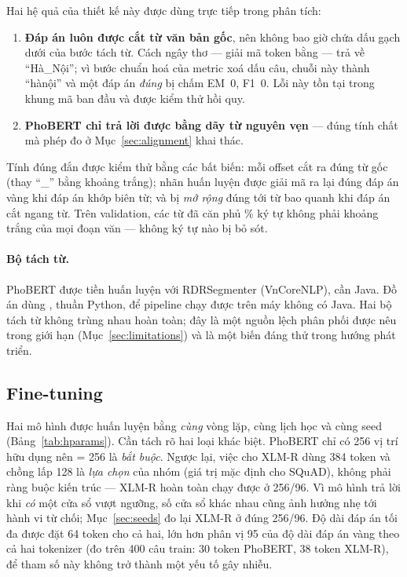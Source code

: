 Hai hệ quả của thiết kế này được dùng trực tiếp trong phân tích:

\begin{enumerate}
  \item \textbf{Đáp án luôn được cắt từ văn bản gốc}, nên không bao giờ chứa dấu gạch dưới
        của bước tách từ. Cách ngây thơ --- giải mã token bằng  --- trả về
        ``Hà\_Nội''; vì bước chuẩn hoá của metric xoá dấu câu, chuỗi này thành ``hànội'' và
        một đáp án \emph{đúng} bị chấm EM~0, F1~0. Lỗi này tồn tại trong khung mã ban đầu và
        được kiểm thử hồi quy.
  \item \textbf{PhoBERT chỉ trả lời được bằng dãy từ nguyên vẹn} --- đúng tính chất mà phép
        đo ở Mục~\ref{sec:alignment} khai thác.
\end{enumerate}

Tính đúng đắn được kiểm thử bằng các bất biến: mỗi offset cắt ra đúng từ gốc (thay ``\_''
bằng khoảng trắng); nhãn huấn luyện được giải mã ra lại đúng đáp án vàng khi đáp án khớp biên
từ; và bị \emph{mở rộng} đúng tới từ bao quanh khi đáp án cắt ngang từ. Trên validation, các từ
đã căn phủ \SegCtxCoverage\% ký tự không phải khoảng trắng của mọi đoạn văn --- không ký tự nào
bị bỏ sót.

\paragraph{Bộ tách từ.} PhoBERT được tiền huấn luyện với RDRSegmenter (VnCoreNLP), cần Java.
Đồ án dùng , thuần Python, để pipeline chạy được trên máy không có Java. Hai bộ tách
từ không trùng nhau hoàn toàn; đây là một nguồn lệch phân phối được nêu trong giới hạn
(Mục~\ref{sec:limitations}) và là một biến đáng thử trong hướng phát triển.

\subsection{Fine-tuning}
\label{sec:finetune}

Hai mô hình được huấn luyện bằng \emph{cùng} vòng lặp, cùng lịch học và cùng seed
(Bảng~\ref{tab:hparams}). Cần tách rõ hai loại khác biệt. PhoBERT chỉ có 256 vị trí hữu dụng nên
 = 256 là \emph{bắt buộc}. Ngược lại, việc cho XLM-R dùng 384 token và chồng lấp
128 là \emph{lựa chọn} của nhóm (giá trị mặc định cho SQuAD), không phải ràng buộc kiến trúc --- XLM-R
hoàn toàn chạy được ở 256/96. Vì mô hình trả lời khi \emph{có} một cửa sổ vượt ngưỡng, số cửa sổ
khác nhau cũng ảnh hưởng nhẹ tới hành vi từ chối; Mục~\ref{sec:seeds} đo lại XLM-R ở đúng 256/96. Độ dài đáp án tối đa được đặt 64 token cho cả hai, lớn hơn phân vị
95 của độ dài đáp án vàng theo cả hai tokenizer (đo trên 400 câu train: 30 token PhoBERT, 38
token XLM-R), để tham số này không trở thành một yếu tố gây nhiễu.

